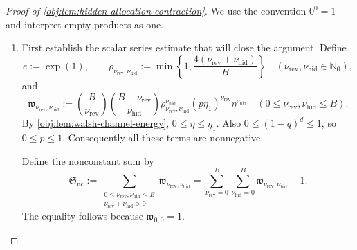 \documentclass[11pt]{article}
\begin{document}
\begin{proof}[Proof of \cref{obj:lem:hidden-allocation-contraction}]
We use the convention \(0^0=1\) and interpret empty products as one.

\begin{enumerate}
\item First establish the scalar series estimate that will close the argument. Define
\[
e:=\exp(1),
\qquad
\rho_{\nu_{\mathrm{rev}},\nu_{\mathrm{hid}}}
:=
\min\left\{1,\frac{4(\nu_{\mathrm{rev}}+\nu_{\mathrm{hid}})}{B}\right\}
\quad
(\nu_{\mathrm{rev}},\nu_{\mathrm{hid}}\in\mathbb N_0),
\]
and
\[
\mathfrak w_{\nu_{\mathrm{rev}},\nu_{\mathrm{hid}}}
:=
\binom B{\nu_{\mathrm{rev}}}
\binom{B-\nu_{\mathrm{rev}}}{\nu_{\mathrm{hid}}}
\rho_{\nu_{\mathrm{rev}},\nu_{\mathrm{hid}}}^{\nu_{\mathrm{hid}}}
(p\eta_1)^{\nu_{\mathrm{rev}}}\eta^{\nu_{\mathrm{hid}}}
\quad
(0\le\nu_{\mathrm{rev}},\nu_{\mathrm{hid}}\le B).
\]
By \cref{obj:lem:walsh-channel-energy},
\(0\le\eta\le\eta_1\). Also \(0\le(1-q)^d\le1\), so \(0\le p\le1\).
Consequently all these terms are nonnegative.

Define the nonconstant sum by
\[
\mathfrak S_{\mathrm{nc}}
:=
\sum_{\substack{0\le\nu_{\mathrm{rev}},\nu_{\mathrm{hid}}\le B\\
\nu_{\mathrm{rev}}+\nu_{\mathrm{hid}}>0}}
\mathfrak w_{\nu_{\mathrm{rev}},\nu_{\mathrm{hid}}}
=
\sum_{\nu_{\mathrm{rev}}=0}^B
\sum_{\nu_{\mathrm{hid}}=0}^B
\mathfrak w_{\nu_{\mathrm{rev}},\nu_{\mathrm{hid}}}-1.
\]
The equality follows because \(\mathfrak w_{0,0}=1\).


\end{enumerate}
\end{proof}
\end{document}
